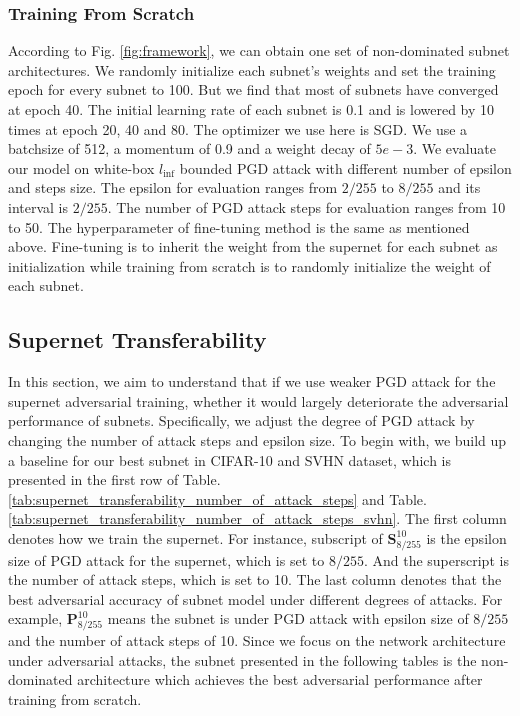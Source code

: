 \documentclass[journal]{IEEEtran}
\newcommand{\revised}[1]{{\color{black} #1}}
\begin{document}
\subsubsection{\textbf{Training From Scratch}}
According to Fig. \ref{fig:framework}, we can obtain one set of non-dominated subnet architectures. We randomly initialize each subnet's weights and set the training epoch for every subnet to 100. But we find that most of subnets have converged at epoch 40. The initial learning rate of each subnet is 0.1 and is lowered by 10 times at epoch 20, 40 and 80. The optimizer we use here is SGD. We use a batchsize of 512, a momentum of 0.9 and a weight decay of $5e-3$. We evaluate our model on white-box $l_{\inf}$ bounded PGD attack with different number of epsilon and steps size. The epsilon for evaluation ranges from $2/255$ to $8/255$ and its interval is $2/255$. The number of PGD attack steps for evaluation ranges from 10 to 50. The hyperparameter of fine-tuning method is the same as mentioned above. Fine-tuning is to inherit the weight from the supernet for each subnet as initialization while training from scratch is to randomly initialize the weight of each subnet. 

\subsection{\textbf{Supernet Transferability}}
In this section, we aim to understand that if we use weaker PGD attack for the supernet adversarial training, whether it would largely deteriorate the adversarial performance of subnets. Specifically, we adjust the degree of PGD attack by changing the number of attack steps and epsilon size. To begin with, we build up a baseline for our best subnet in CIFAR-10 and SVHN dataset, which is presented in the first row of Table.  \ref{tab:supernet_transferability_number_of_attack_steps} and Table. \ref{tab:supernet_transferability_number_of_attack_steps_svhn}. The first column denotes how we train the supernet. For instance, \revised{subscript} of $\textbf{S}_{8/255}^{10}$ is the epsilon size of PGD attack for the supernet, which is set to $8/255$. And the \revised{superscript} is the number of attack steps, which is set to 10. The last column denotes that the best adversarial accuracy of subnet model under different degrees of attacks. For example, $\textbf{P}_{8/255}^{10}$ means the subnet is under PGD attack with epsilon size of $8/255$ and the number of attack steps of 10. Since we focus on the network architecture under adversarial attacks, the subnet presented in the following tables is the non-dominated architecture which achieves the best adversarial performance after training from scratch.
\end{document}
